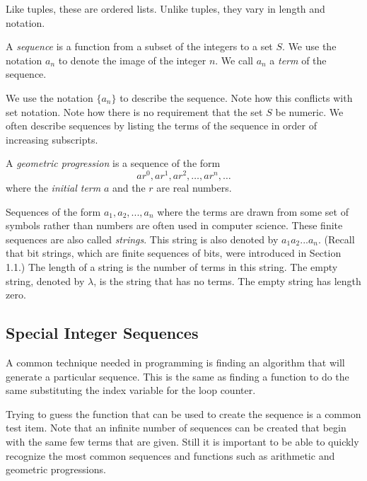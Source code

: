 Like tuples, these are ordered lists. Unlike tuples, they vary in length and notation.

\begin{definition} [Sequence] 
A \textit{sequence} is a function from a subset of the integers to a set $S$. We use the notation $a_n$ to denote the image of the integer $n$. We call $a_n$ a \textit{term} of the sequence. 

We use the notation $\{a_n\}$ to describe the sequence. Note how this conflicts with set notation. Note how there is no requirement that the set $S$ be numeric. We often describe sequences by listing the terms of the sequence in order of increasing subscripts.
\end{definition}

\begin{definition}
A \textit{geometric progression} is a sequence of the form
$$ar^0,ar^1,ar^2, \dots ,ar^n, \dots$$
where the \textit{initial term} $a$ and the  $r$ are real numbers.
\end{definition}

Sequences of the form $a_1, a_2, . . . , a_n$ where the terms are drawn from some set of symbols rather than numbers are often used in computer science. These finite
sequences are also called \textit{strings}. This string is also denoted by $a_1a_2 . . . a_n$. (Recall that bit strings, which are finite sequences of bits, were introduced in Section 1.1.) The length of a
string is the number of terms in this string. The empty string, denoted by $\lambda$, is the string that has no terms. The empty string has length zero.

\subsection{Special Integer Sequences}
A common technique needed in programming is finding an algorithm that will generate a particular sequence. This is the same as finding a function to do the same substituting the index variable for the loop counter. 

Trying to guess the function that can be used to create the sequence is a common test item. Note that an infinite number of sequences can be created that begin with the same few terms that are given. Still it is important to be able to quickly recognize the most common sequences and functions such as arithmetic and geometric progressions. 




